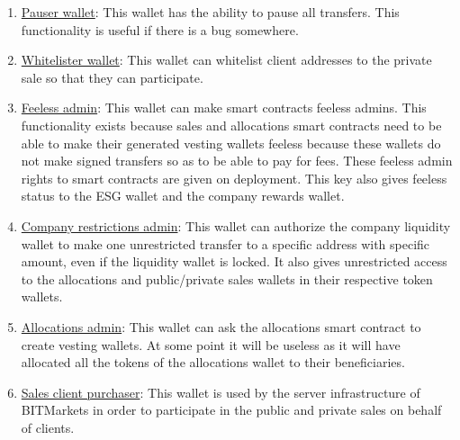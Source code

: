\documentclass[a4paper,12pt]{article}
\begin{document}
\begin{enumerate}
  \item \label{wallet:pauser} \href{https://mumbai.polygonscan.com/address/0xb8b4446eeBc0ACfCdd8eee883E7E432f43f21BD5}{Pauser wallet}: This wallet has the ability to pause all transfers. This functionality is useful if there is a bug somewhere.

  \item \label{wallet:whitelister} \href{https://mumbai.polygonscan.com/address/0x0Eb3519Ef4cee095683Dd54e0a2FE4662Aa893ac}{Whitelister wallet}: This wallet can whitelist client addresses to the private sale so that they can participate.

  \item \label{wallet:feeless} \href{https://mumbai.polygonscan.com/address/0x2d2F031fFEDCdD078fD8AB918Cdb4E41CE396e81}{Feeless admin}: This wallet can make smart contracts feeless admins. This functionality exists because sales and allocations smart contracts need to be able to make their generated vesting wallets feeless because these wallets do not make signed transfers so as to be able to pay for fees. These feeless admin rights to smart contracts are given on deployment. This key also gives feeless status to the ESG wallet and the company rewards wallet.

  \item \label{wallet:restrictions} \href{https://mumbai.polygonscan.com/address/0x5E3dCF54c2272b1E3968294CF7aac11E88831a99}{Company restrictions admin}: This wallet can authorize the company liquidity wallet to make one unrestricted transfer to a specific address with specific amount, even if the liquidity wallet is locked. It also gives unrestricted access to the allocations and public/private sales wallets in their respective token wallets.

  \item \label{wallet:allocationsadmin} \href{https://mumbai.polygonscan.com/address/0x0dD64bb758AaBFa93f4D9EEd8734802A83032920}{Allocations admin}: This wallet can ask the allocations smart contract to create vesting wallets. At some point it will be useless as it will have allocated all the tokens of the allocations wallet to their beneficiaries.

  \item \label{wallet:purchaser} \href{https://mumbai.polygonscan.com/address/0xB98AE0FD75462887301f23f67E07BDA3cae05AC4}{Sales client purchaser}: This wallet is used by the server infrastructure of BITMarkets in order to participate in the public and private sales on behalf of clients.
\end{enumerate}
\end{document}
